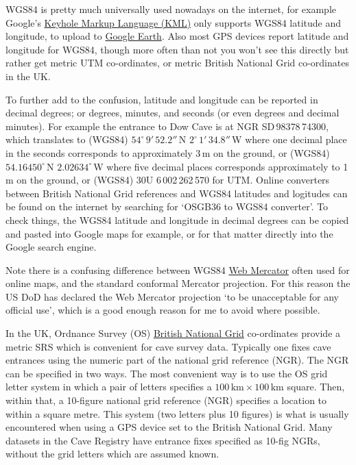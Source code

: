 \documentclass[]{article}
\begin{document}
WGS84 is pretty much universally used nowadays on the internet, for
example Google's \href{https://developers.google.com/kml/}{Keyhole
  Markup Language (KML)} only supports WGS84 latitude and longitude,
to upload to \href{https://en.wikipedia.org/wiki/Google_Earth}{Google
  Earth}.  Also most GPS devices report latitude and longitude for
WGS84, though more often than not you won't see this directly but
rather get metric UTM co-ordinates, or metric British National Grid
co-ordinates in the UK.

To further add to the confusion, latitude and longitude can be
reported in decimal degrees; or degrees, minutes, and seconds (or even
degrees and decimal minutes). For example the entrance to Dow Cave is
at NGR SD\,983{\small78}\,743{\small00}, which translates to (WGS84)
$54^\circ\,9'\,52.2''$\,N $2^\circ\,1'\,34.8''$\,W where one decimal
place in the seconds corresponds to approximately 3\,m on the ground,
or (WGS84) $54.16450^\circ$\,N $2.02634^\circ$\,W where five decimal
places corresponds approximately to 1\,m on the ground, or (WGS84) 30U
6\,002\,262\,570 for UTM. Online converters between British
National Grid references and WGS84 latitudes and logitudes can be
found on the internet by searching for `OSGB36 to WGS84 converter'. To
check things, the WGS84 latitude and longitude in decimal degrees can
be copied and pasted into Google maps for example, or for that matter
directly into the Google search engine.

Note there is a confusing difference between WGS84
\href{https://en.wikipedia.org/wiki/Web_Mercator}{Web Mercator} often
used for online maps, and the standard conformal Mercator projection.
For this reason the US DoD has declared the Web Mercator projection
`to be unacceptable for any official use', which is a good enough
reason for me to avoid where possible.

In the UK, Ordnance Survey (OS)
\href{https://en.wikipedia.org/wiki/Ordnance_Survey_National_Grid}{British
National Grid} co-ordinates provide a metric SRS which is convenient for
cave survey data. Typically one fixes cave entrances using the numeric
part of the national grid reference (NGR). The NGR can be specified in two
ways. The most convenient way is to use the OS grid letter system in
which a pair of letters specifies a
$100\,\mathrm{km}\times100\,\mathrm{km}$ square. Then, within
that, a 10-figure national grid reference (NGR) specifies a location to
within a square metre. This system (two letters plus 10 figures) is what
is usually encountered when using a GPS device set to the British
National Grid. Many datasets in the Cave Registry have entrance fixes
specified as 10-fig NGRs, without the grid letters which are assumed
known.
\end{document}
